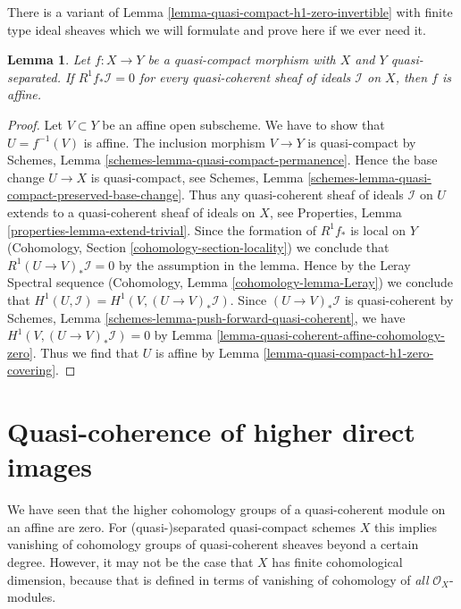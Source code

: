 \documentclass{stacks-project}
\theoremstyle{plain}
\newtheorem{lemma}[subsection]{Lemma}
\theoremstyle{definition}
\theoremstyle{remark}
\numberwithin{equation}{subsection}
\begin{document}
\noindent
There is a variant of Lemma \ref{lemma-quasi-compact-h1-zero-invertible}
with finite type ideal sheaves which we will formulate and prove here if
we ever need it.

\begin{lemma}
\label{lemma-criterion-affine-morphism}
Let $f : X \to Y$ be a quasi-compact morphism with $X$ and $Y$ quasi-separated.
If $R^1f_*\mathcal{I} = 0$ for every quasi-coherent sheaf of ideals
$\mathcal{I}$ on $X$, then $f$ is affine.
\end{lemma}

\begin{proof}
Let $V \subset Y$ be an affine open subscheme. We have to show that
$U = f^{-1}(V)$ is affine. The inclusion morphism $V \to Y$ is quasi-compact
by Schemes, Lemma \ref{schemes-lemma-quasi-compact-permanence}.
Hence the base change $U \to X$ is quasi-compact, see
Schemes, Lemma \ref{schemes-lemma-quasi-compact-preserved-base-change}.
Thus any quasi-coherent sheaf of ideals $\mathcal{I}$ on $U$
extends to a quasi-coherent sheaf of ideals on $X$, see
Properties, Lemma \ref{properties-lemma-extend-trivial}.
Since the formation of $R^1f_*$ is local on $Y$
(Cohomology, Section \ref{cohomology-section-locality})
we conclude that $R^1(U \to V)_*\mathcal{I} = 0$ by the assumption
in the lemma. Hence by the Leray Spectral sequence
(Cohomology, Lemma \ref{cohomology-lemma-Leray})
we conclude that $H^1(U, \mathcal{I}) = H^1(V, (U \to V)_*\mathcal{I})$.
Since $(U \to V)_*\mathcal{I}$ is quasi-coherent by
Schemes, Lemma \ref{schemes-lemma-push-forward-quasi-coherent}, we have
$H^1(V, (U \to V)_*\mathcal{I}) = 0$ by
Lemma \ref{lemma-quasi-coherent-affine-cohomology-zero}.
Thus we find that $U$ is affine by
Lemma \ref{lemma-quasi-compact-h1-zero-covering}.
\end{proof}















\section{Quasi-coherence of higher direct images}
\label{section-quasi-coherence}

\noindent
We have seen that the higher cohomology groups of a quasi-coherent module on
an affine are zero. For (quasi-)separated quasi-compact schemes $X$ this implies
vanishing of cohomology groups of quasi-coherent sheaves beyond a certain
degree. However, it may not be the case that $X$ has finite cohomological
dimension, because that is defined in terms of vanishing of cohomology
of {\it all} $\mathcal{O}_X$-modules.
\end{document}
